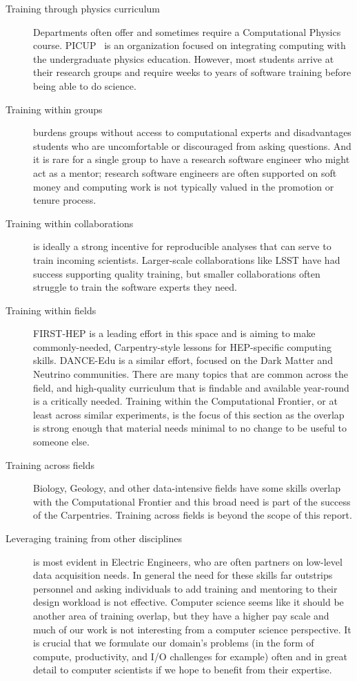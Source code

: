 \begin{description}
  \item [Training through physics curriculum] Departments often offer and sometimes require a Computational Physics course.  PICUP~\cite{Caballero2019-qj} is an organization focused on integrating computing with the undergraduate physics education.  However, most students arrive at their research groups and require weeks to years of software training before being able to do science.
  \item [Training within groups] burdens groups without access to computational experts and disadvantages students who are uncomfortable or discouraged from asking questions.  And it is rare for a single group to have a research software engineer who might act as a mentor; research software engineers are often supported on soft money and computing work is not typically valued in the promotion or tenure process.
  \item [Training within collaborations] is ideally a strong incentive for reproducible analyses that can serve to train incoming scientists.  Larger-scale collaborations like LSST have had success supporting quality training, but smaller collaborations often struggle to train the software experts they need.
  \item [Training within fields] FIRST-HEP is a leading effort in this space and is aiming to make commonly-needed, Carpentry-style lessons for HEP-specific computing skills.  DANCE-Edu is a similar effort, focused on the Dark Matter and Neutrino communities.  There are many topics that are common across the field, and high-quality curriculum that is findable and available year-round is a critically needed.  Training within the Computational Frontier, or at least across similar experiments, is the focus of this section as the overlap is strong enough that material needs minimal to no change to be useful to someone else.
  \item [Training across fields] Biology, Geology, and other data-intensive fields have some skills overlap with the Computational Frontier and this broad need is part of the success of the Carpentries.  Training across fields is beyond the scope of this report.
  \item [Leveraging training from other disciplines] is most evident in Electric Engineers, who are often partners on low-level data acquisition needs.  In general the need for these skills far outstrips personnel and asking individuals to add training and mentoring to their design workload is not effective.  Computer science seems like it should be another area of training overlap, but they have a higher pay scale and much of our work is not interesting from a computer science perspective. It is crucial that we formulate our domain's problems (in the form of compute, productivity, and I/O challenges for example) often and in great detail to computer scientists if we hope to benefit from their expertise.

\end{description}

